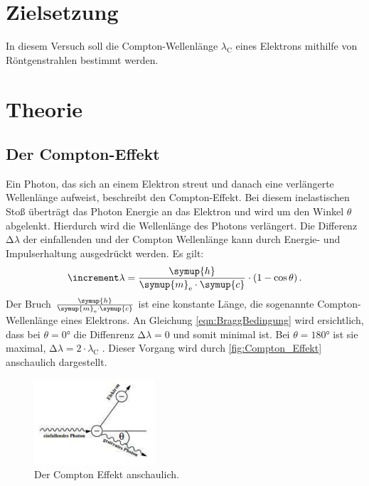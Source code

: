\section{Zielsetzung}
In diesem Versuch soll die Compton-Wellenlänge $\lambda_\text{C}$ eines Elektrons mithilfe von Röntgenstrahlen bestimmt werden.

\section{Theorie}
\label{sec:Theorie}
\subsection{Der Compton-Effekt}
Ein Photon, das sich an einem Elektron streut und danach eine verlängerte Wellenlänge aufweist, beschreibt den Compton-Effekt.
Bei diesem inelastischen Stoß überträgt das Photon Energie an das Elektron und wird um den Winkel $\theta$ abgelenkt.
Hierdurch wird die Wellenlänge des Photons verlängert.
Die Differenz $\increment \lambda$ der einfallenden und der Compton Wellenlänge kann durch Energie- und Impulserhaltung ausgedrückt werden.
Es gilt:
\begin{equation}\label{eqn:diff_lambda}
    \increment \lambda = \frac{\symup{h}}{\symup{m}_\text{e} \cdot \symup{c}} \cdot (1 - \cos\theta) \, .
\end{equation}
Der Bruch $\frac{\symup{h}}{\symup{m}_\text{e} \cdot \symup{c}}$ ist eine konstante Länge, die sogenannte Compton-Wellenlänge eines Elektrons.
An Gleichung \eqref{eqn:BraggBedingung} wird ersichtlich, dass bei $\theta = 0°$ die Diffenrenz $\increment \lambda = 0$ und somit minimal ist.
Bei $\theta = 180°$ ist sie maximal, $\increment \lambda = 2 \cdot \lambda_\text{C}$ .
Dieser Vorgang wird durch \autoref{fig:Compton_Effekt} anschaulich dargestellt.

\begin{figure}
    \centering
    \includegraphics[width=0.4\textwidth]{bilder/compton_effekt.pdf}
    \caption{Der Compton Effekt anschaulich.}
    \label{fig:Compton_Effekt}
\end{figure}

